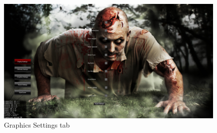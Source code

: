\documentclass[letterpaper]{article}
\begin{document}
			
		\begin{figure}[H]
		\centering
		\includegraphics[width=130mm]{GUI_ScreenShots/GraphicsSettings.jpg}
		\caption{Graphics Settings tab}
		\end{figure}
		
		
		\vspace{0.2in}
\end{document}
